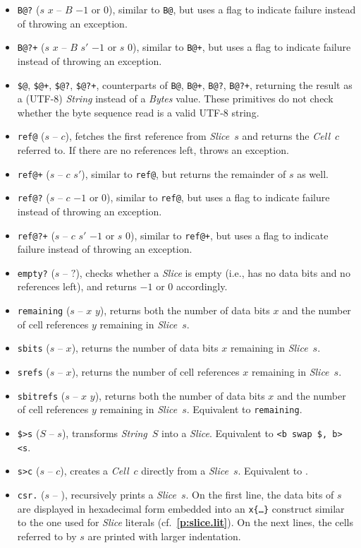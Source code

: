 \documentclass[12pt,oneside]{article}
\def\refpoint#1{{\rm\textbf{\ref{#1}}}}
\let\ptref=\refpoint
\begin{document}
\begin{itemize}
\item {\tt B@?} ($s$ $x$ -- $B$ $-1$ or $0$), similar to {\tt B@}, but uses a flag to indicate failure instead of throwing an exception.
\item {\tt B@?+} ($s$ $x$ -- $B$ $s'$ $-1$ or $s$ $0$), similar to {\tt B@+}, but uses a flag to indicate failure instead of throwing an exception.
\item {\tt \$@}, {\tt \$@+}, {\tt \$@?}, {\tt \$@?+}, counterparts of {\tt B@}, {\tt B@+}, {\tt B@?}, {\tt B@?+}, returning the result as a (UTF-8) {\em String} instead of a {\em Bytes} value. These primitives do not check whether the byte sequence read is a valid UTF-8 string.
\item {\tt ref@} ($s$ -- $c$), fetches the first reference from {\em Slice\/}~$s$ and returns the {\em Cell}~$c$ referred to. If there are no references left, throws an exception.
\item {\tt ref@+} ($s$ -- $c$ $s'$), similar to {\tt ref@}, but returns the remainder of $s$ as well.
\item {\tt ref@?} ($s$ -- $c$ $-1$ or $0$), similar to {\tt ref@}, but uses a flag to indicate failure instead of throwing an exception.
\item {\tt ref@?+} ($s$ -- $c$ $s'$ $-1$ or $s$ $0$), similar to {\tt ref@+}, but uses a flag to indicate failure instead of throwing an exception.
\item {\tt empty?} ($s$ -- $?$), checks whether a {\em Slice\/} is empty (i.e., has no data bits and no references left), and returns $-1$ or $0$ accordingly.
\item {\tt remaining} ($s$ -- $x$ $y$), returns both the number of data bits $x$ and the number of cell references $y$ remaining in {\em Slice\/}~$s$.
\item {\tt sbits} ($s$ -- $x$), returns the number of data bits $x$ remaining in {\em Slice\/}~$s$.
\item {\tt srefs} ($s$ -- $x$), returns the number of cell references $x$ remaining in {\em Slice\/}~$s$.
\item {\tt sbitrefs} ($s$ -- $x$ $y$), returns both the number of data bits $x$ and the number of cell references $y$ remaining in {\em Slice\/}~$s$. Equivalent to {\tt remaining}.
\item {\tt \$>s} ($S$ -- $s$), transforms {\em String}~$S$ into a {\em Slice}. Equivalent to {\tt <b swap \$, b> <s}.
\item {\tt s>c} ($s$ -- $c$), creates a {\em Cell}~$c$ directly from a {\em Slice}~$s$. Equivalent to {\tt <b swap s, b>}.
\item {\tt csr.} ($s$ -- ), recursively prints a {\em Slice}~$s$. On the first line, the data bits of $s$ are displayed in hexadecimal form embedded into an {\tt x\{\dots\}} construct similar to the one used for {\em Slice\/} literals (cf.~\ptref{p:slice.lit}). On the next lines, the cells referred to by $s$ are printed with larger indentation.
\end{itemize}
\end{document}
